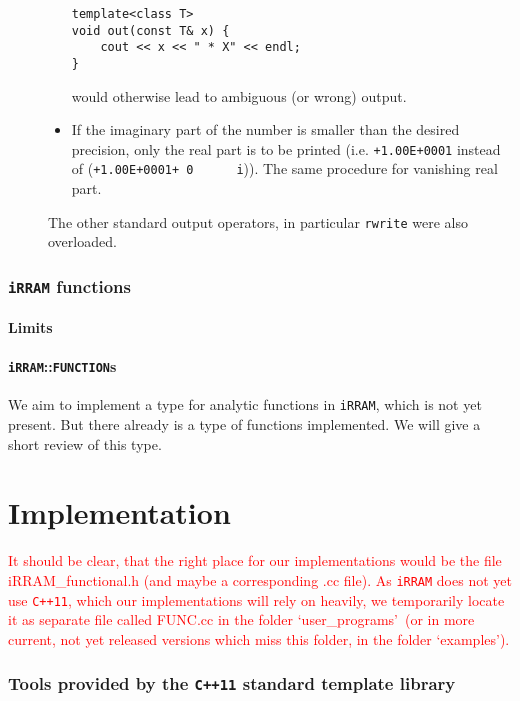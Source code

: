 \documentclass{article}
\newcommand{\irram}{\texttt{iRRAM}\xspace}
\newcommand{\ccOx}{\texttt{C++11}\xspace}
\newcommand{\ir}[1]{\texttt{#1}}
\newcommand{\code}[1]{\texttt{#1}}
\newcommand{\temp}[1]{\textcolor{red}{#1}}
\begin{document}
\begin{description}
\begin{itemize}
\begin{lstlisting}
template<class T>
void out(const T& x) {
	cout << x << " * X" << endl;
}
\end{lstlisting}
would otherwise lead to ambiguous (or wrong) output.
\item If the imaginary part of the number is smaller than the desired precision, only the real part is to be printed (i.e. \code{+1.00E+0001} instead of (\code{+1.00E+0001+ 0 \ \ \ \ \  i})). The same procedure for vanishing real part.
\end{itemize}
The other standard output operators, in particular \ir{rwrite} were also overloaded.
\end{description}

\section{\irram functions}

\subsection{Limits}

\subsection{\irram::\ir{FUNCTION}s}

We aim to implement a type for analytic functions in \irram, which is not yet present. But there already is a type of functions implemented. We will give a short review of this type.

\part{Implementation}

\temp{It should be clear, that the right place for our implementations would be the file iRRAM\_functional.h (and maybe a corresponding .cc file). As \irram does not yet use \ccOx, which our implementations will rely on heavily, we temporarily locate it as separate file called FUNC.cc in the folder \lq user\_programs\rq\ (or in more current, not yet released versions which miss this folder, in the folder \lq examples\rq).}

\section{Tools provided by the \ccOx standard template library}
\end{document}
